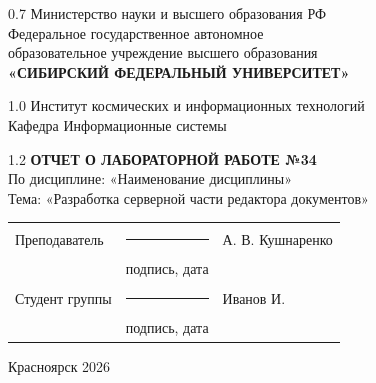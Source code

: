 \begin{titlepage}
	\begin{center}
		\begin{spacing}{0.7}
		Министерство науки и высшего образования РФ\\
		{\small Федеральное государственное автономное}\\
		{\small образовательное учреждение высшего образования}\\
		\textbf{\small«СИБИРСКИЙ ФЕДЕРАЛЬНЫЙ УНИВЕРСИТЕТ»}\\
		\end{spacing}
		
		\vfill
		
		\begin{spacing}{1.0}
		Институт космических и информационных технологий\\
		Кафедра Информационные системы\\
		\end{spacing}
		
		\vfill
		\vfill
		
		\begin{spacing}{1.2}
			\textbf{\large ОТЧЕТ О ЛАБОРАТОРНОЙ РАБОТЕ №34}\\[5mm]
			По дисциплине: «Наименование дисциплины»\\[3mm]
			Тема: «Разработка серверной части редактора документов»
		\end{spacing}
    \end{center}		

	\vfill
	\vfill
	
\noindent
\begin{tabular}{@{} p{} p{} p{} @{}}
	Преподаватель    & \rule{3.5cm}{.1pt} & А. В. Кушнаренко \\
	                 & {\scriptsize подпись, дата} & \\ [4ex]
	Студент группы   & \rule{3.5cm}{.1pt} & Иванов И. \\
	 & {\scriptsize подпись, дата} & \\
\end{tabular}

\vfill
\begin{center}Красноярск 2026\end{center}
\end{titlepage}
\restoregeometry